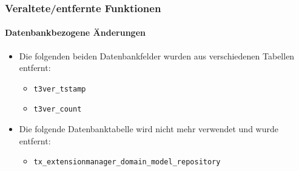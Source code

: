 %

\begin{frame}[fragile]
	\frametitle{Veraltete/entfernte Funktionen}
	\framesubtitle{Datenbankbezogene Änderungen}

	\begin{itemize}
		\item Die folgenden beiden Datenbankfelder wurden aus verschiedenen Tabellen entfernt:
			\begin{itemize}\small
				\item \texttt{t3ver\_tstamp}
				\item \texttt{t3ver\_count}
			\end{itemize}\normalsize
			\vspace{0.2cm}

		\item Die folgende Datenbanktabelle wird nicht mehr verwendet und wurde entfernt:
			\begin{itemize}\small
				\item \texttt{tx\_extensionmanager\_domain\_model\_repository}
			\end{itemize}\normalsize
			\vspace{0.2cm}

	\end{itemize}

\end{frame}

